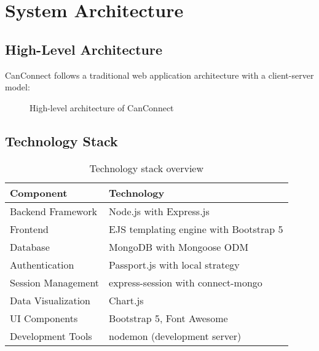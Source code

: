 \documentclass[12pt,a4paper]{report}
\begin{document}
\chapter{System Architecture}

\section{High-Level Architecture}
CanConnect follows a traditional web application architecture with a client-server model:

\begin{figure}[H]
\centering
{}
\caption{High-level architecture of CanConnect}
\end{figure}

\section{Technology Stack}
\begin{table}[H]
\centering
\begin{tabularx}{\textwidth}{lX}
\toprule
\textbf{Component} & \textbf{Technology} \\
\midrule
Backend Framework & Node.js with Express.js \\
Frontend & EJS templating engine with Bootstrap 5 \\
Database & MongoDB with Mongoose ODM \\
Authentication & Passport.js with local strategy \\
Session Management & express-session with connect-mongo \\
Data Visualization & Chart.js \\
UI Components & Bootstrap 5, Font Awesome \\
Development Tools & nodemon (development server) \\
\bottomrule
\end{tabularx}
\caption{Technology stack overview}
\end{table}
\end{document}
